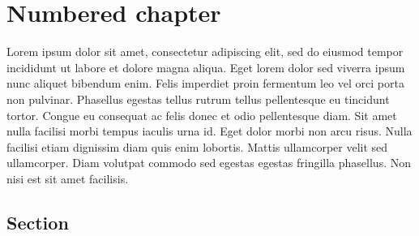 \documentclass[
]{article}
\begin{document}
\section{Numbered chapter}\label{numbered-chapter}

Lorem ipsum dolor sit amet, consectetur adipiscing elit, sed do eiusmod
tempor incididunt ut labore et dolore magna aliqua. Eget lorem dolor sed
viverra ipsum nunc aliquet bibendum enim. Felis imperdiet proin
fermentum leo vel orci porta non pulvinar. Phasellus egestas tellus
rutrum tellus pellentesque eu tincidunt tortor. Congue eu consequat ac
felis donec et odio pellentesque diam. Sit amet nulla facilisi morbi
tempus iaculis urna id. Eget dolor morbi non arcu risus. Nulla facilisi
etiam dignissim diam quis enim lobortis. Mattis ullamcorper velit sed
ullamcorper. Diam volutpat commodo sed egestas egestas fringilla
phasellus. Non nisi est sit amet facilisis.

\subsection{Section}\label{section}
\end{document}
